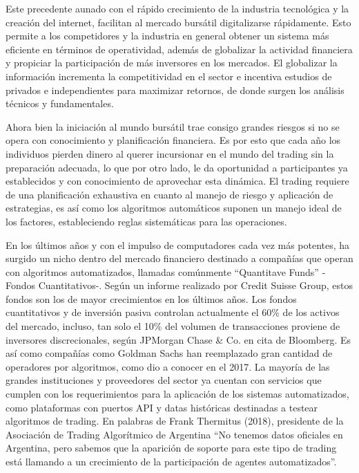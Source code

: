 \documentclass[a4paper,12pt]{Latex/Classes/PhDthesisPSnPDF}
\begin{document}
Este precedente aunado con el rápido crecimiento de la industria tecnológica y la creación del internet, facilitan al mercado bursátil digitalizarse rápidamente. Esto permite a los competidores y la industria en general obtener un sistema más eficiente en términos de operatividad, además de globalizar la actividad financiera y propiciar la participación de más inversores en los mercados. El globalizar la información incrementa la competitividad en el sector e incentiva estudios de privados e independientes para maximizar retornos, de donde surgen los análisis técnicos y fundamentales.

Ahora bien la iniciación al mundo bursátil trae consigo grandes riesgos si no se opera con conocimiento y planificación financiera. Es por esto que cada año los individuos pierden dinero al querer incursionar en el mundo del trading sin la preparación adecuada, lo que por otro lado, le da oportunidad a participantes ya establecidos y con conocimiento de aprovechar esta dinámica. El trading requiere de una planificación exhaustiva en cuanto al manejo de riesgo y aplicación de estrategias, es así como los algoritmos automáticos suponen un manejo ideal de los factores, estableciendo reglas sistemáticas para las operaciones.

En los últimos años y con el impulso de computadores cada vez más potentes, ha surgido un nicho dentro del mercado financiero destinado a compañías que operan con algoritmos automatizados, llamadas comúnmente “Quantitave Funds” -Fondos Cuantitativos-. Según un informe realizado por Credit Suisse Group, estos fondos son los de mayor crecimientos en los últimos años. Los fondos cuantitativos y de inversión pasiva controlan actualmente el 60\% de los activos del mercado, incluso, tan solo el 10\% del volumen de transacciones proviene de inversores discrecionales, según JPMorgan Chase \& Co. en cita de Bloomberg. Es así como compañías como Goldman Sachs han reemplazado gran cantidad de operadores por algoritmos, como dio a conocer en el 2017. La mayoría de las grandes instituciones y proveedores del sector ya cuentan con servicios que cumplen con los requerimientos para la aplicación de los sistemas automatizados, como plataformas con puertos API y datas históricas destinadas a testear algoritmos de trading. En palabras de Frank Thermitus (2018), presidente de la Asociación de Trading Algorítmico de Argentina “No tenemos datos oficiales en Argentina, pero sabemos que la aparición de soporte para este tipo de trading está llamando a un crecimiento de la participación de agentes automatizados”.
\end{document}
